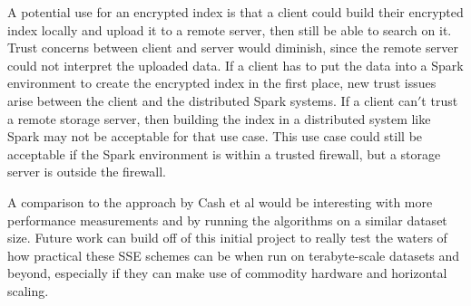 \documentclass{sig-alternate-05-2015}
\begin{document}
A potential use for an encrypted index is that a client could build their encrypted index locally and upload it to a remote server, then still be able to search on it. Trust concerns between client and server would diminish, since the remote server could not interpret the uploaded data. If a client has to put the data into a Spark environment to create the encrypted index in the first place, new trust issues arise between the client and the distributed Spark systems. If a client can$'$t trust a remote storage server, then building the index in a distributed system like Spark may not be acceptable for that use case. This use case could still be acceptable if the Spark environment is within a trusted firewall, but a storage server is outside the firewall.

A comparison to the approach by Cash et al would be interesting with more performance measurements and by running the algorithms on a similar dataset size. Future work can build off of this initial project to really test the waters of how practical these SSE schemes can be when run on terabyte-scale datasets and beyond, especially if they can make use of commodity hardware and horizontal scaling.





\end{document}
